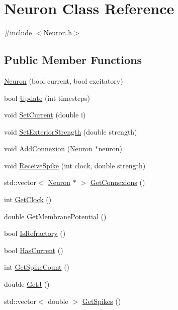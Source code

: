 \hypertarget{classNeuron}{\section{Neuron Class Reference}
\label{classNeuron}
}


{\ttfamily \#include $<$Neuron.\-h$>$}

\subsection*{Public Member Functions}
\begin{DoxyCompactItemize}
\item 
\hyperlink{classNeuron_a52a92d02ab8290c1b9dc242582b60534}{Neuron} (bool current, bool excitatory)
\item 
bool \hyperlink{classNeuron_a900d8743fde5efc8326e496b26cd71c6}{Update} (int timesteps)
\item 
void \hyperlink{classNeuron_ab5fb956509b5207949f7b66bc2ba33a3}{Set\-Current} (double i)
\item 
void \hyperlink{classNeuron_a2ea3de64d673ef72586dca024ba68c8d}{Set\-Exterior\-Strength} (double strength)
\item 
void \hyperlink{classNeuron_aeef13eda9b9a714a0b4bb817d05de59f}{Add\-Connexion} (\hyperlink{classNeuron}{Neuron} $\ast$neuron)
\item 
void \hyperlink{classNeuron_aeb372d758da70180013df3505932f8ae}{Receive\-Spike} (int clock, double strength)
\item 
std\-::vector$<$ \hyperlink{classNeuron}{Neuron} $\ast$ $>$ \hyperlink{classNeuron_ae345f06a301715aa0a6a43a098353bd4}{Get\-Connexions} ()
\item 
int \hyperlink{classNeuron_a8448900068b8bdc4cc940c10dc4e3756}{Get\-Clock} ()
\item 
double \hyperlink{classNeuron_aa708f257202e0d7bb3c8d0edb5296226}{Get\-Membrane\-Potential} ()
\item 
bool \hyperlink{classNeuron_ac466a54499068e4074c56e604ad01b88}{Is\-Refractory} ()
\item 
bool \hyperlink{classNeuron_ab80c0f443f6cab83a0d83bf1295af119}{Has\-Current} ()
\item 
int \hyperlink{classNeuron_affc1aaf55cbdc986ad39ce12ee1a79a2}{Get\-Spike\-Count} ()
\item 
double \hyperlink{classNeuron_ac1133062bdb6aaac5fe47f83459d4753}{Get\-J} ()
\item 
std\-::vector$<$ double $>$ \hyperlink{classNeuron_ae958f1cc23f8a903567db6d934c5c082}{Get\-Spikes} ()
\end{DoxyCompactItemize}


